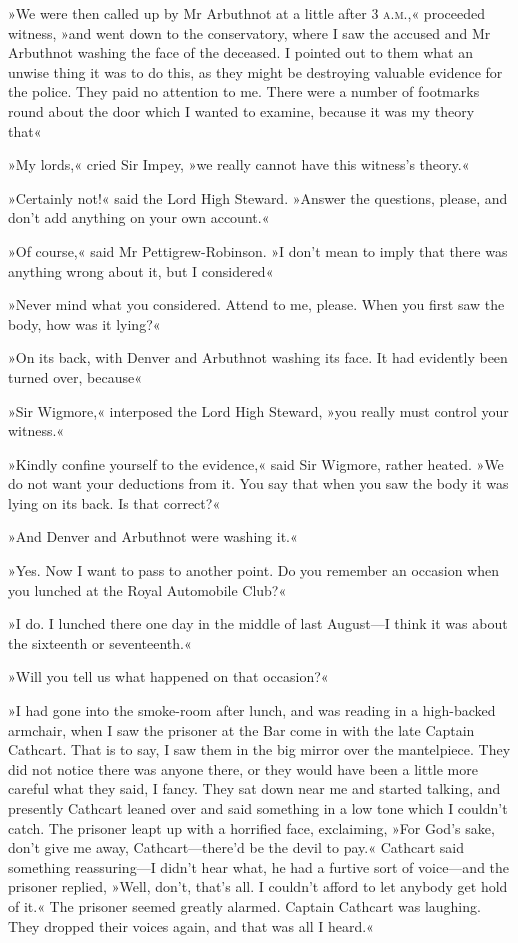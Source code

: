 »We were then called up by Mr Arbuthnot at a little after 3 \textsc{a.m.},« proceeded witness, »and went down to the conservatory, where I saw the accused and Mr Arbuthnot washing the face of the deceased. I pointed out to them what an unwise thing it was to do this, as they might be destroying valuable evidence for the police. They paid no attention to me. There were a number of footmarks round about the door which I wanted to examine, because it was my theory that\longdash«

»My lords,« cried Sir Impey, »we really cannot have this witness's theory.«

»Certainly not!« said the Lord High Steward. »Answer the questions, please, and don't add anything on your own account.«

»Of course,« said Mr Pettigrew-Robinson. »I don't mean to imply that there was anything wrong about it, but I considered\longdash«

»Never mind what you considered. Attend to me, please. When you first saw the body, how was it lying?«

»On its back, with Denver and Arbuthnot washing its face. It had evidently been turned over, because\longdash«

»Sir Wigmore,« interposed the Lord High Steward, »you really must control your witness.«

»Kindly confine yourself to the evidence,« said Sir Wigmore, rather heated. »We do not want your deductions from it. You say that when you saw the body it was lying on its back. Is that correct?«

»And Denver and Arbuthnot were washing it.«

»Yes. Now I want to pass to another point. Do you remember an occasion when you lunched at the Royal Automobile Club?«

»I do. I lunched there one day in the middle of last August—I think it was about the sixteenth or seventeenth.«

»Will you tell us what happened on that occasion?«

»I had gone into the smoke-room after lunch, and was reading in a high-backed armchair, when I saw the prisoner at the Bar come in with the late Captain Cathcart. That is to say, I saw them in the big mirror over the mantelpiece. They did not notice there was anyone there, or they would have been a little more careful what they said, I fancy.  They sat down near me and started talking, and presently Cathcart leaned over and said something in a low tone which I couldn't catch.  The prisoner leapt up with a horrified face, exclaiming, »For God's sake, don't give me away, Cathcart—there'd be the devil to pay.« Cathcart said something reassuring—I didn't hear what, he had a furtive sort of voice—and the prisoner replied, »Well, don't, that's all. I couldn't afford to let anybody get hold of it.« The prisoner seemed greatly alarmed. Captain Cathcart was laughing. They dropped their voices again, and that was all I heard.«

